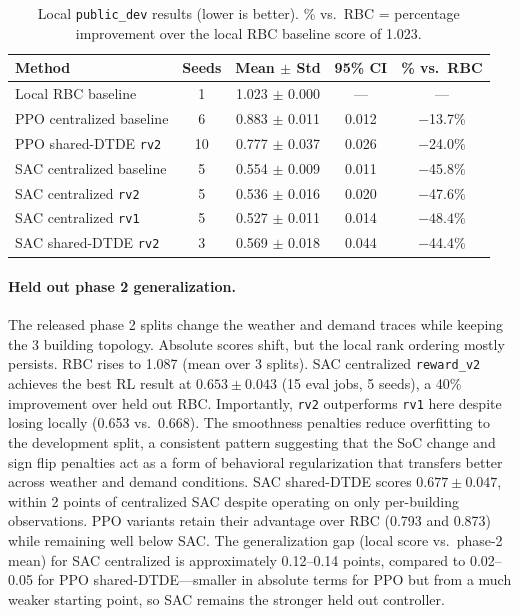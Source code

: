 \documentclass{article}
\begin{document}
\begin{table}[h]
\centering
\small
\begin{tabular}{lcccc}
\toprule
\textbf{Method} & \textbf{Seeds} & \textbf{Mean $\pm$ Std} & \textbf{95\% CI} & \textbf{\% vs.\ RBC} \\
\midrule
Local RBC baseline        & 1  & 1.023 $\pm$ 0.000 & ---   & --- \\
PPO centralized baseline  & 6  & 0.883 $\pm$ 0.011 & 0.012 & $-$13.7\% \\
PPO shared-DTDE \texttt{rv2}    & 10 & 0.777 $\pm$ 0.037 & 0.026 & $-$24.0\% \\
SAC centralized baseline  & 5  & 0.554 $\pm$ 0.009 & 0.011 & $-$45.8\% \\
SAC centralized \texttt{rv2}    & 5  & 0.536 $\pm$ 0.016 & 0.020 & $-$47.6\% \\
SAC centralized \texttt{rv1}    & 5  & 0.527 $\pm$ 0.011 & 0.014 & $-48.4\%$ \\
SAC shared-DTDE \texttt{rv2}    & 3  & 0.569 $\pm$ 0.018 & 0.044 & $-$44.4\% \\
\bottomrule
\end{tabular}
\caption{Local \texttt{public\_dev} results (lower is better). \% vs.\ RBC = percentage improvement over the local RBC baseline score of 1.023.}
\label{tab local}
\end{table}

\paragraph{Held out phase 2 generalization.} The released phase 2 splits change the weather and demand traces while keeping the 3 building topology. Absolute scores shift, but the local rank ordering mostly persists. RBC rises to 1.087 (mean over 3 splits). SAC centralized \texttt{reward\_v2} achieves the best RL result at $0.653 \pm 0.043$ (15 eval jobs, 5 seeds), a 40\% improvement over held out RBC. Importantly, \texttt{rv2} outperforms \texttt{rv1} here despite losing locally (0.653 vs.\ 0.668). The smoothness penalties reduce overfitting to the development split, a consistent pattern suggesting that the SoC change and sign flip penalties act as a form of behavioral regularization that transfers better across weather and demand conditions. SAC shared-DTDE scores $0.677 \pm 0.047$, within 2 points of centralized SAC despite operating on only per-building observations. PPO variants retain their advantage over RBC (0.793 and 0.873) while remaining well below SAC. The generalization gap (local score vs.\ phase-2 mean) for SAC centralized is approximately 0.12--0.14 points, compared to 0.02--0.05 for PPO shared-DTDE---smaller in absolute terms for PPO but from a much weaker starting point, so SAC remains the stronger held out controller.
\end{document}
